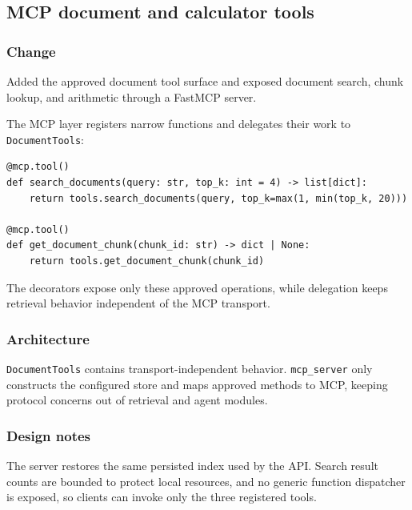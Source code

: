 
\subsection{MCP document and calculator tools}


\subsubsection{Change}

Added the approved document tool surface and exposed document search, chunk lookup, and arithmetic through a FastMCP server.

The MCP layer registers narrow functions and delegates their work to \texttt{DocumentTools}:

\begin{verbatim}
@mcp.tool()
def search_documents(query: str, top_k: int = 4) -> list[dict]:
    return tools.search_documents(query, top_k=max(1, min(top_k, 20)))

@mcp.tool()
def get_document_chunk(chunk_id: str) -> dict | None:
    return tools.get_document_chunk(chunk_id)
\end{verbatim}

The decorators expose only these approved operations, while delegation keeps retrieval behavior independent of the MCP transport.

\subsubsection{Architecture}

\texttt{DocumentTools} contains transport-independent behavior. \texttt{mcp\_server} only constructs the configured store and maps approved methods to MCP, keeping protocol concerns out of retrieval and agent modules.

\subsubsection{Design notes}

The server restores the same persisted index used by the API. Search result counts are bounded to protect local resources, and no generic function dispatcher is exposed, so clients can invoke only the three registered tools.

